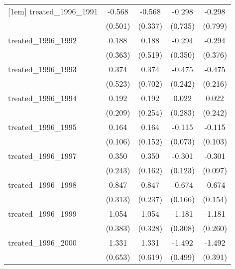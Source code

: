 {\begin{tabular}{l*{4}{c}}
[1em]
treated\_1996\_1991&      -0.568         &      -0.568         &      -0.298         &      -0.298         \\
            &     (0.501)         &     (0.337)         &     (0.735)         &     (0.799)         \\
[1em]
treated\_1996\_1992&       0.188         &       0.188         &      -0.294         &      -0.294         \\
            &     (0.363)         &     (0.519)         &     (0.350)         &     (0.376)         \\
[1em]
treated\_1996\_1993&       0.374         &       0.374         &      -0.475\sym{*}  &      -0.475\sym{*}  \\
            &     (0.523)         &     (0.702)         &     (0.242)         &     (0.216)         \\
[1em]
treated\_1996\_1994&       0.192         &       0.192         &       0.022         &       0.022         \\
            &     (0.209)         &     (0.254)         &     (0.283)         &     (0.242)         \\
[1em]
treated\_1996\_1995&       0.164         &       0.164         &      -0.115         &      -0.115         \\
            &     (0.106)         &     (0.152)         &     (0.073)         &     (0.103)         \\
[1em]
treated\_1996\_1997&       0.350         &       0.350\sym{*}  &      -0.301\sym{*}  &      -0.301\sym{**} \\
            &     (0.243)         &     (0.162)         &     (0.123)         &     (0.097)         \\
[1em]
treated\_1996\_1998&       0.847\sym{**} &       0.847\sym{***}&      -0.674\sym{***}&      -0.674\sym{***}\\
            &     (0.313)         &     (0.237)         &     (0.166)         &     (0.154)         \\
[1em]
treated\_1996\_1999&       1.054\sym{**} &       1.054\sym{**} &      -1.181\sym{***}&      -1.181\sym{***}\\
            &     (0.383)         &     (0.328)         &     (0.308)         &     (0.260)         \\
[1em]
treated\_1996\_2000&       1.331\sym{*}  &       1.331\sym{*}  &      -1.492\sym{**} &      -1.492\sym{***}\\
            &     (0.653)         &     (0.619)         &     (0.499)         &     (0.391)         \\

\end{tabular}}
